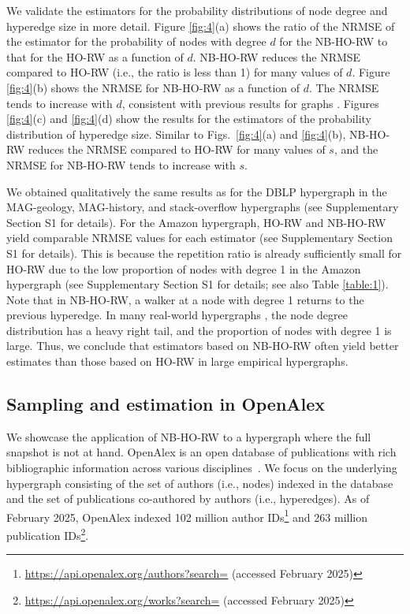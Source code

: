 We validate the estimators for the probability distributions of node degree and hyperedge size in more detail.  
Figure \ref{fig:4}(a) shows the ratio of the NRMSE of the estimator for the probability of nodes with degree $d$ for the NB-HO-RW to that for the HO-RW as a function of $d$.  
NB-HO-RW reduces the NRMSE compared to HO-RW (i.e., the ratio is less than 1) for many values of $d$.  
Figure \ref{fig:4}(b) shows the NRMSE for NB-HO-RW as a function of $d$.  
The NRMSE tends to increase with $d$, consistent with previous results for graphs \cite{lee2012}.  
Figures \ref{fig:4}(c) and \ref{fig:4}(d) show the results for the estimators of the probability distribution of hyperedge size.  
Similar to Figs.~\ref{fig:4}(a) and \ref{fig:4}(b), NB-HO-RW reduces the NRMSE compared to HO-RW for many values of $s$, and the NRMSE for NB-HO-RW tends to increase with $s$.

We obtained qualitatively the same results as for the DBLP hypergraph in the MAG-geology, MAG-history, and stack-overflow hypergraphs (see Supplementary Section S1 for details).
For the Amazon hypergraph, HO-RW and NB-HO-RW yield comparable NRMSE values for each estimator (see Supplementary Section S1 for details).  
This is because the repetition ratio is already sufficiently small for HO-RW due to the low proportion of nodes with degree 1 in the Amazon hypergraph (see Supplementary Section S1 for details; see also Table \ref{table:1}).  
Note that in NB-HO-RW, a walker at a node with degree 1 returns to the previous hyperedge.  
In many real-world hypergraphs \cite{do2020}, the node degree distribution has a heavy right tail, and the proportion of nodes with degree 1 is large.  
Thus, we conclude that estimators based on NB-HO-RW often yield better estimates than those based on HO-RW in large empirical hypergraphs.

\subsection{Sampling and estimation in OpenAlex} \label{section:3.2}

We showcase the application of NB-HO-RW to a hypergraph where the full snapshot is not at hand.
OpenAlex is an open database of publications with rich bibliographic information across various disciplines~\cite{priem2022}.
We focus on the underlying hypergraph consisting of the set of authors (i.e., nodes) indexed in the database and the set of publications co-authored by authors (i.e., hyperedges).
As of February 2025, OpenAlex indexed 102 million author IDs\footnote{\url{https://api.openalex.org/authors?search=} (accessed February 2025)} and 263 million publication IDs\footnote{\url{https://api.openalex.org/works?search=} (accessed February 2025)}.

